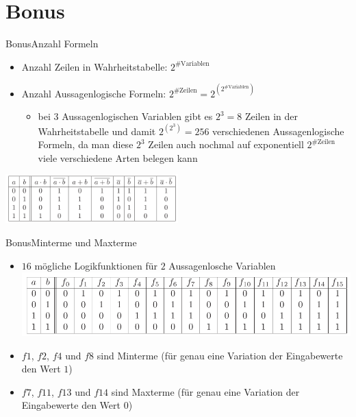 
\section{Bonus}
\begin{frame}{Bonus}{Anzahl Formeln}
  \begin{itemize}
    \item Anzahl \alert{Zeilen in Wahrheitstabelle:} $2^{\text{\# Variablen}}$
    \item Anzahl \alert{Aussagenlogische Formeln:} $2^{\text{\#Zeilen}} = 2^{\left(2^{\text{\#Variablen}}\right)}$
    \begin{itemize}
      \item bei 3 \alert{Aussagenlogischen Variablen} gibt es $2^3=8$ Zeilen in der Wahrheitstabelle und damit $2^{(2^3)}=256$ verschiedenen Aussagenlogische Formeln, da man diese $2^3$ Zeilen auch nochmal auf \alert{exponentiell} $2^{\text{\#Zeilen}}$ viele verschiedene Arten belegen kann
    \end{itemize}
  \end{itemize}
  \includegraphics[width=0.5\textwidth, center]{./figures/_2021-11-22-18-46-04.png}
\end{frame}

\begin{frame}{Bonus}{Minterme und Maxterme}
  \begin{itemize}
    \item $16$ mögliche \alert{Logikfunktionen} für $2$ \alert{Aussagenlosche Variablen}
      \includegraphics[width=\linewidth]{figures/_2021-11-22-18-01-18.png}
    \item $f1$, $f2$, $f4$ und $f8$ sind \alert{Minterme} (für genau eine Variation der Eingabewerte den Wert $1$)
    \item $f7$, $f11$, $f13$ und $f14$ sind \alert{Maxterme} (für genau eine Variation der Eingabewerte den Wert $0$)
  \end{itemize}
\end{frame}

